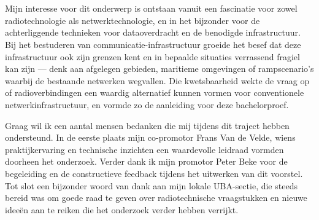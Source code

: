 
\chapter*{}%
\label{ch:voorwoord}


Mijn interesse voor dit onderwerp is ontstaan vanuit een fascinatie voor zowel radiotechnologie
als netwerktechnologie, en in het bijzonder voor de achterliggende technieken voor dataoverdracht
en de benodigde infrastructuur. Bij het bestuderen van communicatie-infrastructuur groeide het
besef dat deze infrastructuur ook zijn grenzen kent en in bepaalde situaties verrassend fragiel
kan zijn --- denk aan afgelegen gebieden, maritieme omgevingen of rampscenario's waarbij de
bestaande netwerken wegvallen. Die kwetsbaarheid wekte de vraag op of radioverbindingen een
waardig alternatief kunnen vormen voor conventionele netwerkinfrastructuur, en vormde zo de
aanleiding voor deze bachelorproef.

Graag wil ik een aantal mensen bedanken die mij tijdens dit traject hebben ondersteund.
In de eerste plaats mijn co-promotor Frans Van de Velde, wiens praktijkervaring en technische
inzichten een waardevolle leidraad vormden doorheen het onderzoek. Verder dank ik mijn
promotor Peter Beke voor de begeleiding en de constructieve feedback tijdens het uitwerken
van dit voorstel. Tot slot een bijzonder woord van dank aan mijn lokale UBA-sectie, die steeds
bereid was om goede raad te geven over radiotechnische vraagstukken en nieuwe ideeën aan
te reiken die het onderzoek verder hebben verrijkt.